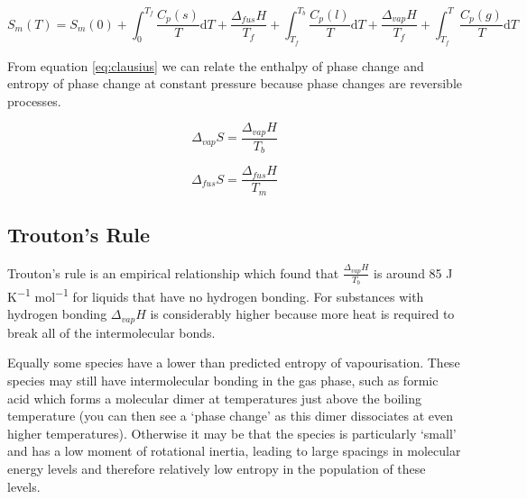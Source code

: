 \documentclass[
]{book}
\begin{document}
\begin{equation}
S_m(T) = S_m(0)+ \int_0^{T_f}\frac{C_p(s)}{T}\textrm{d}T+ \frac{\Delta _{fus} H}{T_f}+ \int_{T_f}^{T_b}\frac{C_p(l)}{T}\textrm{d}T+ \frac{\Delta _{vap} H}{T_f}+ \int_{T_f}^T\frac{C_p(g)}{T}\textrm{d}T
\label{eq:entropyphase}
\end{equation}

From equation \eqref{eq:clausius} we can relate the enthalpy of phase change and entropy of phase change at constant pressure because phase changes are reversible processes.

\begin{equation}
\Delta_{vap} S=\frac{\Delta_{vap} H }{T_b}
\label{eq:entropyvap}
\end{equation}

\begin{equation}
\Delta_{fus} S=\frac{\Delta_{fus} H }{T_m}
\label{eq:entropyfus}
\end{equation}

\hypertarget{troutons-rule}{%
\subsection{Trouton's Rule}\label{troutons-rule}}

Trouton's rule is an empirical relationship which found that \(\frac{\Delta_{vap} H }{T_b}\) is around 85 J K\textsuperscript{−1} mol\textsuperscript{−1} for liquids that have no hydrogen bonding. For substances with hydrogen bonding \(\Delta_{vap} H\) is considerably higher because more heat is required to break all of the intermolecular bonds.

Equally some species have a lower than predicted entropy of vapourisation. These species may still have intermolecular bonding in the gas phase, such as formic acid which forms a molecular dimer at temperatures just above the boiling temperature (you can then see a `phase change' as this dimer dissociates at even higher temperatures). Otherwise it may be that the species is particularly `small' and has a low moment of rotational inertia, leading to large spacings in molecular energy levels and therefore relatively low entropy in the population of these levels.
\end{document}
